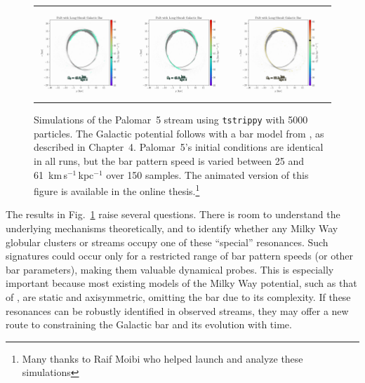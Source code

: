 \begin{figure}
\begin{tabular}{ccc}
                \includegraphics[width=.32\linewidth]{images/frame_0065.png}&
                \includegraphics[width=.32\linewidth]{images/frame_0066.png}&
                \includegraphics[width=.32\linewidth]{images/frame_0104.png}\\
            \end{tabular}
            \caption[The presence of a stellar bar with different rotational speeds affecting the Palomar~5 stream]{Simulations of the Palomar~5 stream using \texttt{tstrippy} with 5000 particles. The Galactic potential follows \citet{2017A&A...598A..66P} with a bar model from \citet{1997MNRAS.291..717M}, as described in Chapter~4. Palomar~5's initial conditions are identical in all runs, but the bar pattern speed is varied between 25 and 61~km\,s$^{-1}$\,kpc$^{-1}$ over 150 samples. The animated version of this figure is available in the online thesis.\footnote{Many thanks to Raif Moibi who helped launch and analyze these simulations}}
            \label{fig:pal5_with_bar}
        \end{figure}

        The results in Fig.~\ref{fig:pal5_with_bar} raise several questions. There is room to understand the underlying mechanisms theoretically, and to identify whether any Milky Way globular clusters or streams occupy one of these ``special'' resonances. Such signatures could occur only for a restricted range of bar pattern speeds (or other bar parameters), making them valuable dynamical probes. This is especially important because most existing models of the Milky Way potential, such as that of \citet{2024ApJ...967...89I}, are static and axisymmetric, omitting the bar due to its complexity. If these resonances can be robustly identified in observed streams, they may offer a new route to constraining the Galactic bar and its evolution with time.

